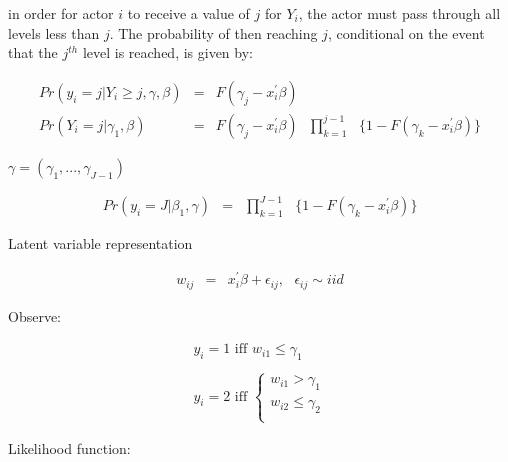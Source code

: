 in order for actor $i$ to receive a value of $j$ for $Y_{i}$, the actor must pass through all levels less than $j$. The probability of then reaching $j$, conditional on the event that the $j^{th}$ level is reached, is given by:

\begin{eqnarray}
	Pr(y_{i}={j} | Y_{i} \geq {j}, \gamma, \beta) &=& F(\gamma_{j} - x_{i}^{'}\beta) \nonumber \\
	Pr(Y_{i}={j}|\gamma_{1},\beta) &=& F(\gamma_{j} - x_{i}^{'}\beta)\text{ }\prod^{j-1}_{k=1}\text{ }\{1-F(\gamma_{k}-x_{i}^{'}\beta)\} \nonumber
\end{eqnarray}

$\gamma = (\gamma_{1},...,\gamma_{J-1})$

\begin{eqnarray}
	Pr(y_{i}=J|\beta_{1},\gamma) &=&\text{}\prod^{J-1}_{k=1}\text{ }\{1-F(\gamma_{k}-x_{i}^{'}\beta)\} \nonumber
\end{eqnarray}

Latent variable representation

\begin{eqnarray}
	w_{ij} &=& x_{i}^{'}\beta+\epsilon_{ij},\text{ }\epsilon_{ij} \sim iid \nonumber
\end{eqnarray}

Observe:

\begin{eqnarray}
	y_{i} = 1\text{ iff } w_{i1} \leq \gamma_{1} \nonumber \\
	\nonumber \\
	y_{i} = 2\text{ iff }
	\begin{cases}
	w_{i1} > \gamma_{1} \nonumber \\
	w_{i2} \leq \gamma_{2} \nonumber \\
\end{cases}
\end{eqnarray}

Likelihood function:

